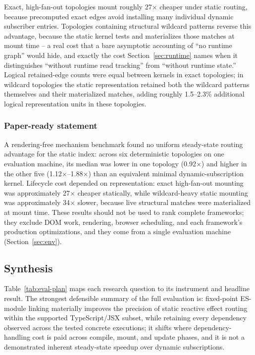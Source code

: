 \documentclass[conference]{IEEEtran}
\begin{document}
Exact, high-fan-out topologies mount roughly 27$\times$ cheaper under static
routing, because precomputed exact edges avoid installing many individual
dynamic subscriber entries. Topologies containing structural wildcard
patterns reverse this advantage, because the static kernel tests and
materializes those matches at mount time -- a real
cost that a bare asymptotic accounting of ``no runtime graph'' would hide,
and exactly the cost Section~\ref{sec:runtime} names when it distinguishes
``without runtime read tracking'' from ``without runtime state.'' Logical
retained-edge counts were equal between kernels in exact topologies; in
wildcard topologies the static representation retained both the wildcard
patterns themselves and their materialized matches, adding roughly
1.5--2.3\% additional logical representation units in these topologies.

\subsubsection{Paper-ready statement}
A rendering-free mechanism benchmark found no uniform steady-state routing
advantage for the static index: across six deterministic topologies on one
evaluation machine, its median was lower in one topology (0.92$\times$) and
higher in the other five (1.12$\times$--1.88$\times$) than an equivalent
minimal dynamic-subscription kernel. Lifecycle cost depended on
representation: exact high-fan-out mounting was approximately 27$\times$
cheaper statically, while wildcard-heavy static mounting was approximately
34$\times$ slower, because live structural matches were
materialized at mount time. These results should not be used to rank
complete frameworks; they exclude DOM work, rendering, browser scheduling,
and each framework's production optimizations, and they come from a single
evaluation machine (Section~\ref{sec:env}).

\subsection{Synthesis}

Table~\ref{tab:eval-plan} maps each research question to its instrument and
headline result. The strongest defensible summary of the full evaluation is:
fixed-point ES-module linking materially improves the precision of static
reactive effect routing within the supported TypeScript/JSX subset, while
retaining every dependency observed across the tested concrete executions;
it shifts where dependency-handling cost is paid across compile, mount, and
update phases, and it is not a demonstrated inherent steady-state speedup
over dynamic subscriptions.
\end{document}

